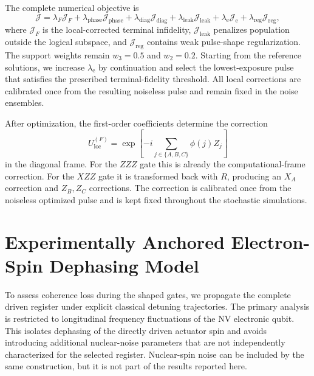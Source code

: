\documentclass[
  aps,
  pra,
  reprint,            %
  superscriptaddress, %
  amsmath,amssymb,
  notitlepage
]{revtex4-2}
\begin{document}
The complete numerical objective is
\begin{equation}
\mathcal J
=
\lambda_F\mathcal J_{F}
+\lambda_{\mathrm{phase}}\mathcal J_{\mathrm{phase}}
+\lambda_{\mathrm{diag}}\mathcal J_{\mathrm{diag}}
+\lambda_{\mathrm{leak}}\mathcal J_{\mathrm{leak}}
+\lambda_{\mathrm e}\mathcal J_{\mathrm e}
+\lambda_{\mathrm{reg}}\mathcal J_{\mathrm{reg}},
\label{eq:complete_nv_cost}
\end{equation}
where $\mathcal J_F$ is the local-corrected terminal infidelity, $\mathcal J_{\mathrm{leak}}$ penalizes population outside the logical subspace, and $\mathcal J_{\mathrm{reg}}$ contains weak pulse-shape regularization. The support weights remain $w_3=0.5$ and $w_2=0.2$. Starting from the reference solutions, we increase $\lambda_{\mathrm e}$ by continuation and select the lowest-exposure pulse that satisfies the prescribed terminal-fidelity threshold. All local corrections are calibrated once from the resulting noiseless pulse and remain fixed in the noise ensembles.

After optimization, the first-order coefficients determine the correction
\begin{equation}
U_{\mathrm{loc}}^{(F)}
=
\exp\!\left[
-i\sum_{j\in\{A,B,C\}}\phi(j)Z_j
\right]
\label{eq:fixed_local_correction_frame}
\end{equation}
in the diagonal frame. For the $ZZZ$ gate this is already the computational-frame correction. For the $XZZ$ gate it is transformed back with $R$, producing an $X_A$ correction and $Z_B,Z_C$ corrections. The correction is calibrated once from the noiseless optimized pulse and is kept fixed throughout the stochastic simulations.

\section{Experimentally Anchored Electron-Spin Dephasing Model}
\label{sec:ou_dephasing_model}

To assess coherence loss during the shaped gates, we propagate the complete driven register under explicit classical detuning trajectories. The primary analysis is restricted to longitudinal frequency fluctuations of the NV electronic qubit. This isolates dephasing of the directly driven actuator spin and avoids introducing additional nuclear-noise parameters that are not independently characterized for the selected register. Nuclear-spin noise can be included by the same construction, but it is not part of the results reported here.
\end{document}

